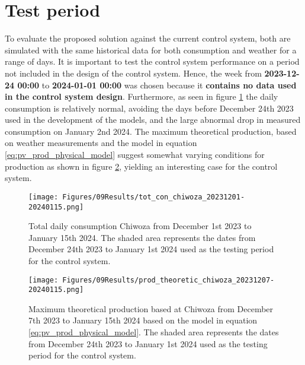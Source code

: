 \section{Test period}
To evaluate the proposed solution against the current control system, both are simulated with the same historical data for both consumption and weather for a range of days. It is important to test the control system performance on a period not included in the design of the control system. Hence, the week from \textbf{2023-12-24 00:00} to \textbf{2024-01-01 00:00} was chosen because it \textbf{contains no data used in the control system design}. Furthermore, as seen in figure \ref{fig:tot_con_chiwoza_20231201-20240115} the daily consumption is relatively normal, avoiding the days before December 24th 2023 used in the development of the models, and the large abnormal drop in measured consumption on January 2nd 2024. The maximum theoretical production, based on weather measurements and the model in equation \ref{eq:pv_prod_physical_model} suggest somewhat varying conditions for production as shown in figure \ref{fig:prod_theoretic_chiwoza_20231207-20240115}, yielding an interesting case for the control system.

\begin{figure}[h]
    \centering
    \texttt{[image: Figures/09Results/tot\_con\_chiwoza\_20231201-20240115.png]}
    \caption[Total daily consumption Chiwoza 20231201-20240115]{Total daily consumption Chiwoza from December 1st 2023 to January 15th 2024. The shaded area represents the dates from December 24th 2023 to January 1st 2024 used as the testing period for the control system.}
    \label{fig:tot_con_chiwoza_20231201-20240115}
\end{figure}

\begin{figure}[h]
    \centering
    \texttt{[image: Figures/09Results/prod\_theoretic\_chiwoza\_20231207-20240115.png]}
    \caption[Theoretical max production Chiwoza 20231207-2024015]{Maximum theoretical production based at Chiwoza from December 7th 2023 to January 15th 2024 based on the model in equation \ref{eq:pv_prod_physical_model}. The shaded area represents the dates from December 24th 2023 to January 1st 2024 used as the testing period for the control system.}
    \label{fig:prod_theoretic_chiwoza_20231207-20240115}
\end{figure}

